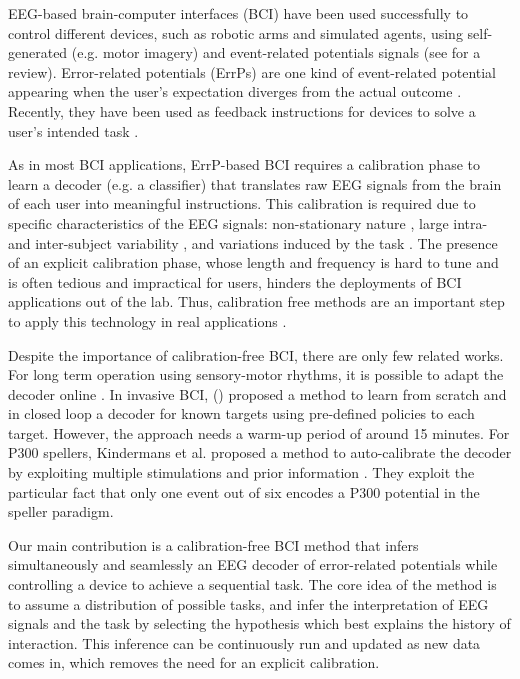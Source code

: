 \documentclass[letterpaper]{article}
\begin{document}
EEG-based brain-computer interfaces (BCI) have been used successfully to control different devices, such as robotic arms and simulated agents, using self-generated (e.g. motor imagery) and event-related potentials signals (see \cite{millan2010combining} for a review). 
%
Error-related potentials (ErrPs) are one kind of event-related potential appearing when the user's expectation diverges from the actual outcome \cite{Falkenstein00}. Recently, they have been used as feedback instructions for devices to solve a user's intended task \cite{chavarriaga2010learning,iturrate13}.

As in most BCI applications, ErrP-based BCI requires a calibration phase to learn a decoder (e.g. a classifier) that translates raw EEG signals from the brain of each user into meaningful instructions. This calibration is required due to specific characteristics of the EEG signals: non-stationary nature \cite{vidaurre2011toward}, large intra- and inter-subject variability \cite{Polich1997}, and variations induced by the task \cite{IturrateErrP13}. The presence of an explicit calibration phase, whose length and frequency is hard to tune and is often tedious and impractical for users, hinders the deployments of BCI applications out of the lab. Thus, calibration free methods are an important step to apply this technology in real applications \cite{millan2010combining}.

Despite the importance of calibration-free BCI, there are only few related works. For long term operation using sensory-motor rhythms, it is possible to adapt the decoder online \cite{vidaurre2010towards}. In invasive BCI, \citeauthor{Orsborn2012} (\citeyear{Orsborn2012}) proposed a method to learn from scratch and in closed loop a decoder for known targets using pre-defined policies to each target.  However, the approach needs a warm-up period of around 15 minutes. For P300 spellers, Kindermans et al. proposed a method to auto-calibrate the decoder by exploiting multiple stimulations and prior information \cite{kindermans2012bayesian,kindermans2012p300,tangermann2013zero}. They exploit the particular fact that only one event out of six encodes a P300 potential in the speller paradigm.

Our main contribution is a calibration-free BCI method that infers simultaneously and seamlessly an EEG decoder of error-related potentials while controlling a device to achieve a sequential task. The core idea of the method is to assume a distribution of possible tasks, and infer the interpretation of EEG signals and the task by selecting the hypothesis which best explains the history of interaction. This inference can be continuously run and updated as new data comes in, which removes the need for an explicit calibration.
\end{document}
